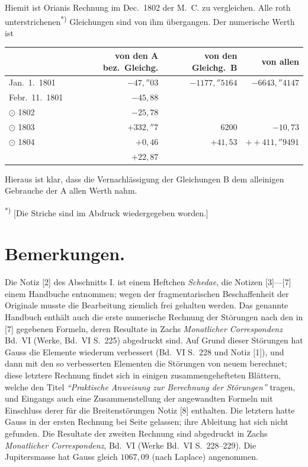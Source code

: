 \documentclass[12pt,a4paper]{article}
\newcommand{\Ceres}{\odot}
\begin{document}
Hiemit ist Orianis Rechnung im Dec.~1802 der M.~C. zu vergleichen. Alle roth unterstrichenen\textsuperscript{*)} Gleichungen sind von ihm übergangen. Der numerische Werth ist

\begin{center}
\begin{tabular}{l@{\quad}r@{\quad}r@{\quad}r}
\toprule
& von den A bez.~Gleichg. & von den Gleichg.~B & von allen \\
\midrule
Jan.~1.~1801 & $-47{,}''03$ & $-1177{,}''5164$ & $-6643{,}''4147$\\
Febr.~11.~1801 & $-45{,}88$\\
$\Ceres$ 1802 & $-25{,}78$\\
$\Ceres$ 1803 & $+332{,}''7$ & $6200$ & $-10{,}73$\\
$\Ceres$ 1804 & $+0{,}46$ & $+41{,}53$ & $++411{,}''9491$\\
& $+22{,}87$ \\
\bottomrule
\end{tabular}
\end{center}

Hieraus ist klar, dass die Vernachlässigung der Gleichungen B dem alleinigen Gebrauche der A allen Werth nahm.

\smallskip\noindent\textsuperscript{*)} [Die Striche sind im Abdruck wiedergegeben worden.]

\newpage
\setcounter{page}{420}
%
\section*{Bemerkungen.}

Die Notiz [2] des Abschnitts I. ist einem Heftchen \textit{Schedae}, die Notizen [3]---[7] einem Handbuche entnommen; wegen der fragmentarischen Beschaffenheit der Originale musste die Bearbeitung ziemlich frei gehalten werden. Das genannte Handbuch enthält auch die erste numerische Rechnung der Störungen nach den in [7] gegebenen Formeln, deren Resultate in Zachs \textit{Monatlicher Correspondenz} Bd.~VI (Werke, Bd.~VI S.~225) abgedruckt sind. Auf Grund dieser Störungen hat Gauss die Elemente wiederum verbessert (Bd.~VI S.~228 und Notiz [1]), und dann mit den so verbesserten Elementen die Störungen von neuem berechnet; diese letztere Rechnung findet sich in einigen zusammengehefteten Blättern, welche den Titel \textit{``Praktische Anweisung zur Berechnung der Störungen''} tragen, und Eingangs auch eine Zusammenstellung der angewandten Formeln mit Einschluss derer für die Breitenstörungen Notiz [8] enthalten. Die letztern hatte Gauss in der ersten Rechnung bei Seite gelassen; ihre Ableitung hat sich nicht gefunden. Die Resultate der zweiten Rechnung sind abgedruckt in Zachs \textit{Monatlicher Correspondenz}, Bd.~VI (Werke Bd.~VI S.~228--229). Die Jupitersmasse hat Gauss gleich $1067{,}09$ (nach Laplace) angenommen.
\end{document}
